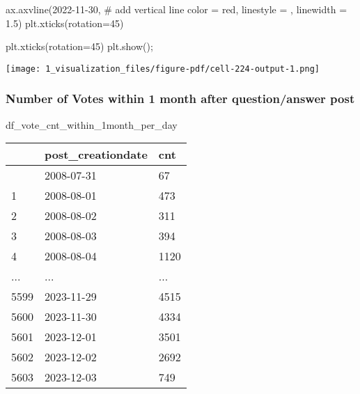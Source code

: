 \documentclass[
  letterpaper,
  DIV=11,
  numbers=noendperiod]{scrartcl}
\newenvironment{Shaded}{\begin{snugshade}}{\end{snugshade}}
\newcommand{\CommentTok}[1]{\textcolor[rgb]{0.37,0.37,0.37}{#1}}
\newcommand{\DecValTok}[1]{\textcolor[rgb]{0.68,0.00,0.00}{#1}}
\newcommand{\FloatTok}[1]{\textcolor[rgb]{0.68,0.00,0.00}{#1}}
\newcommand{\NormalTok}[1]{\textcolor[rgb]{0.00,0.23,0.31}{#1}}
\newcommand{\OperatorTok}[1]{\textcolor[rgb]{0.37,0.37,0.37}{#1}}
\newcommand{\StringTok}[1]{\textcolor[rgb]{0.13,0.47,0.30}{#1}}
\begin{document}
\begin{Shaded}
\begin{Highlighting}[]
\NormalTok{ax.axvline(}\StringTok{\textquotesingle{}2022{-}11{-}30\textquotesingle{}}\NormalTok{, }\CommentTok{\# add vertical line}
\NormalTok{           color }\OperatorTok{=} \StringTok{\textquotesingle{}red\textquotesingle{}}\NormalTok{,}
\NormalTok{           linestyle }\OperatorTok{=} \StringTok{\textquotesingle{}{-}{-}\textquotesingle{}}\NormalTok{,}
\NormalTok{           linewidth }\OperatorTok{=} \FloatTok{1.5}\NormalTok{)}
\NormalTok{plt.xticks(rotation}\OperatorTok{=}\DecValTok{45}\NormalTok{)}

\NormalTok{plt.xticks(rotation}\OperatorTok{=}\DecValTok{45}\NormalTok{)}
\NormalTok{plt.show()}\OperatorTok{;}
\end{Highlighting}
\end{Shaded}

\texttt{[image: 1\_visualization\_files/figure-pdf/cell-224-output-1.png]}

\subsubsection{Number of Votes within 1 month after question/answer
post}\label{number-of-votes-within-1-month-after-questionanswer-post}

\begin{Shaded}
\begin{Highlighting}[]
\NormalTok{df\_vote\_cnt\_within\_1month\_per\_day}
\end{Highlighting}
\end{Shaded}

\begin{longtable}[]{@{}lll@{}}
\toprule\noalign{}
& post\_creationdate & cnt \\
\midrule\noalign{}
\endhead
\bottomrule\noalign{}
\endlastfoot
0 & 2008-07-31 & 67 \\
1 & 2008-08-01 & 473 \\
2 & 2008-08-02 & 311 \\
3 & 2008-08-03 & 394 \\
4 & 2008-08-04 & 1120 \\
... & ... & ... \\
5599 & 2023-11-29 & 4515 \\
5600 & 2023-11-30 & 4334 \\
5601 & 2023-12-01 & 3501 \\
5602 & 2023-12-02 & 2692 \\
5603 & 2023-12-03 & 749 \\
\end{longtable}
\end{document}
